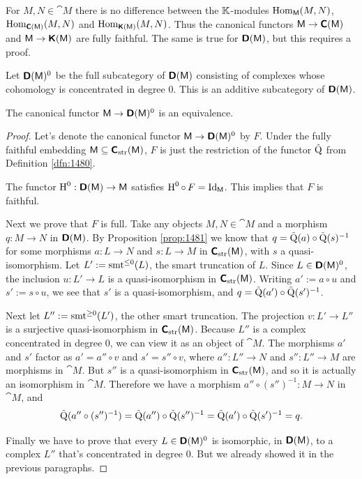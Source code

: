 For $M, N \in \cat{M}$ there is no difference between the $\mathbb{K}$-modules
$\operatorname{Hom}_{\operatorname{\mathsf{M}}}(M, N)$, $\operatorname{Hom}_{\boldsymbol{\mathsf{C}}(\operatorname{\mathsf{M}})}(M, N)$ and 
$\operatorname{Hom}_{\boldsymbol{\mathsf{K}}(\operatorname{\mathsf{M}})}(M, N)$. Thus the canonical functors 
$\operatorname{\mathsf{M}} \to \boldsymbol{\mathsf{C}}(\operatorname{\mathsf{M}})$ and 
$\operatorname{\mathsf{M}} \to \boldsymbol{\mathsf{K}}(\operatorname{\mathsf{M}})$ are fully faithful. 
The same is true for $\boldsymbol{\mathsf{D}}(\operatorname{\mathsf{M}})$, but this requires a proof.

Let $\boldsymbol{\mathsf{D}}(\operatorname{\mathsf{M}})^0$ be the full subcategory of 
$\boldsymbol{\mathsf{D}}(\operatorname{\mathsf{M}})$ consisting of complexes whose cohomology is 
concentrated in degree $0$. This is an additive subcategory of 
$\boldsymbol{\mathsf{D}}(\operatorname{\mathsf{M}})$.

\begin{prop} \label{prop:121}
The canonical functor $\operatorname{\mathsf{M}} \to \boldsymbol{\mathsf{D}}(\operatorname{\mathsf{M}})^0$ 
is an equivalence.
\end{prop}

\begin{proof}
Let's denote the canonical functor $\operatorname{\mathsf{M}} \to \boldsymbol{\mathsf{D}}(\operatorname{\mathsf{M}})^0$ 
by $F$. Under the fully faithful embedding 
$\operatorname{\mathsf{M}} \subseteq \boldsymbol{\mathsf{C}}_{\mathrm{str}}(\operatorname{\mathsf{M}})$,
$F$ is just the restriction of the functor $\tilde{\operatorname{Q}}$ from Definition 
\ref{dfn:1480}.

The functor $\operatorname{H}^0 : \boldsymbol{\mathsf{D}}(\operatorname{\mathsf{M}}) \to \operatorname{\mathsf{M}}$
satisfies $\operatorname{H}^0 \circ \, F = \operatorname{Id}_{\operatorname{\mathsf{M}}}$. This implies 
that $F$ is faithful.

Next we prove that $F$ is full. Take any objects $M, N \in \cat{M}$ and a 
morphism $q : M \to N$ in $\boldsymbol{\mathsf{D}}(\operatorname{\mathsf{M}})$. 
By Proposition \ref{prop:1481} we know that  
$q = \tilde{\operatorname{Q}}(a) \circ \tilde{\operatorname{Q}}(s)^{-1}$ for some
morphisms $a : L \to N$ and $s : L \to M$ in 
$\boldsymbol{\mathsf{C}}_{\mathrm{str}}(\operatorname{\mathsf{M}})$, with $s$
a quasi-isomorphism. Let $L' := \operatorname{smt}^{\leq 0}(L)$, the smart truncation of 
$L$. Since $L \in \boldsymbol{\mathsf{D}}(\operatorname{\mathsf{M}})^0$, the inclusion 
$u : L' \to L$ is a quasi-isomorphism  in $\boldsymbol{\mathsf{C}}_{\mathrm{str}}(\operatorname{\mathsf{M}})$. 
Writing $a' := a \circ u$ and $s' := s \circ u$, we see that $s'$ is a 
quasi-isomorphism, and
$q = \tilde{\operatorname{Q}}(a') \circ \tilde{\operatorname{Q}}(s')^{-1}$. 

Next let $L'' := \operatorname{smt}^{\geq 0}(L')$, the other smart truncation. 
The projection $v : L' \to L''$ is a surjective quasi-isomorphism in 
$\boldsymbol{\mathsf{C}}_{\mathrm{str}}(\operatorname{\mathsf{M}})$. 
Because $L''$ is a complex concentrated in degree $0$, we can view it as 
an object of $\cat{M}$. The morphisms $a'$ and $s'$ factor 
as $a' = a'' \circ v$ and $s' = s'' \circ v$, where 
$a'' : L'' \to N$ and $s'' : L'' \to M$ are morphisms 
in $\cat{M}$. But $s''$ is a quasi-isomorphism in 
$\boldsymbol{\mathsf{C}}_{\mathrm{str}}(\operatorname{\mathsf{M}})$, and so it is actually an isomorphism in 
$\cat{M}$. Therefore we have a morphism 
$a'' \circ (s'')^{-1} : M \to N$
in $\cat{M}$, and 
\[ \tilde{\operatorname{Q}}(a'' \circ (s'')^{-1}) = 
\tilde{\operatorname{Q}}(a'') \circ \tilde{\operatorname{Q}}(s'')^{-1} = 
\tilde{\operatorname{Q}}(a') \circ \tilde{\operatorname{Q}}(s')^{-1} =  q  . \]

Finally we have to prove that every $L \in \boldsymbol{\mathsf{D}}(\operatorname{\mathsf{M}})^0$ is isomorphic, 
in $\boldsymbol{\mathsf{D}}(\operatorname{\mathsf{M}})$, to a complex $L''$ that's concentrated in degree $0$. 
But we already showed it in the previous paragraphs.
\end{proof}

